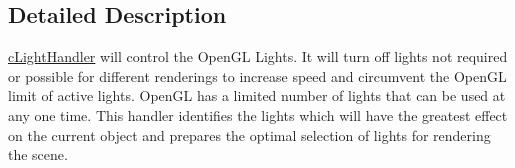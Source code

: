 \subsection{Detailed Description}
\hyperlink{classc_light_handler}{cLightHandler} will control the OpenGL Lights. It will turn off lights not required or possible for different renderings to increase speed and circumvent the OpenGL limit of active lights. OpenGL has a limited number of lights that can be used at any one time. This handler identifies the lights which will have the greatest effect on the current object and prepares the optimal selection of lights for rendering the scene. 